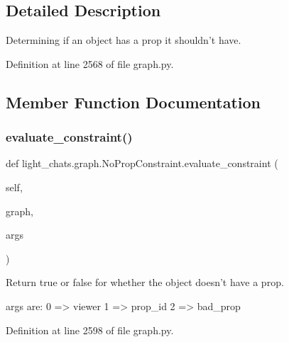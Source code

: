 \subsection{Detailed Description}
\begin{DoxyVerb}Determining if an object has a prop it shouldn't have.
\end{DoxyVerb}
 

Definition at line 2568 of file graph.\+py.



\subsection{Member Function Documentation}
\mbox{\label{classlight__chats_1_1graph_1_1NoPropConstraint_a9a109d3e7b10297b01d79409838be126}} 
\subsubsection{\texorpdfstring{evaluate\+\_\+constraint()}{evaluate\_constraint()}}
{\footnotesize\ttfamily def light\+\_\+chats.\+graph.\+No\+Prop\+Constraint.\+evaluate\+\_\+constraint (\begin{DoxyParamCaption}\item[{}]{self,  }\item[{}]{graph,  }\item[{}]{args }\end{DoxyParamCaption})}

\begin{DoxyVerb}Return true or false for whether the object doesn't have a prop.

args are:     0 => viewer     1 => prop_id     2 => bad_prop
\end{DoxyVerb}
 

Definition at line 2598 of file graph.\+py.


